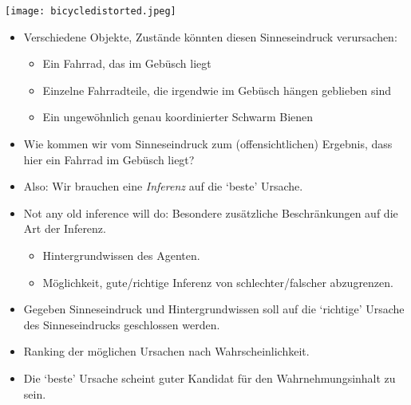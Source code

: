\documentclass[11pt, handout]{beamer}
\begin{document}
\begin{frame}[plain]
  \begin{center}
    \texttt{[image: bicycledistorted.jpeg]}
  \end{center}
\end{frame}

\begin{frame}
  \begin{itemize}[<+->]
  \item Verschiedene Objekte, Zustände könnten diesen Sinneseindruck
    verursachen:
    \begin{itemize}[<+->]
    \item Ein Fahrrad, das im Gebüsch liegt
    \item Einzelne Fahrradteile, die irgendwie im Gebüsch hängen
      geblieben sind
    \item Ein ungewöhnlich genau koordinierter Schwarm Bienen
    \end{itemize}
  \item Wie kommen wir vom Sinneseindruck zum (offensichtlichen)
    Ergebnis, dass hier ein Fahrrad im Gebüsch liegt?
  \end{itemize}

\end{frame}


\begin{frame}
  \begin{itemize}[<+->]
  \item Also: Wir brauchen eine \emph{Inferenz} auf die `beste' Ursache.
  \item Not any old inference will do: Besondere zusätzliche
    Beschränkungen auf die Art der Inferenz.
    \begin{itemize}[<+->]
    \item Hintergrundwissen des Agenten.
    \item Möglichkeit, gute/richtige Inferenz von schlechter/falscher
      abzugrenzen.
    \end{itemize}
  \end{itemize}
\end{frame}


\begin{frame}
  \begin{itemize}[<+->]
  \item Gegeben Sinneseindruck und Hintergrundwissen soll auf die
    `richtige' Ursache des Sinneseindrucks geschlossen werden.
  \item Ranking der möglichen Ursachen nach Wahrscheinlichkeit.
  \item Die `beste' Ursache scheint guter Kandidat für den
    Wahrnehmungsinhalt zu sein.
  \end{itemize}

\end{frame}
\end{document}
